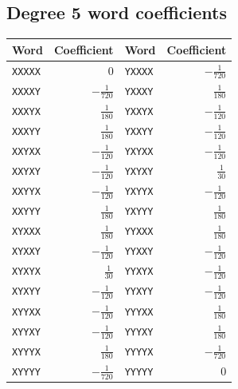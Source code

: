 \subsection*{Degree 5 word coefficients}
\begin{center}\small\begin{tabular}{lrlr}\toprule
Word & Coefficient & Word & Coefficient\\\midrule
\texttt{XXXXX} & $0$ & \texttt{YXXXX} & $-\tfrac{1}{720}$\\
\texttt{XXXXY} & $-\tfrac{1}{720}$ & \texttt{YXXXY} & $\tfrac{1}{180}$\\
\texttt{XXXYX} & $\tfrac{1}{180}$ & \texttt{YXXYX} & $-\tfrac{1}{120}$\\
\texttt{XXXYY} & $\tfrac{1}{180}$ & \texttt{YXXYY} & $-\tfrac{1}{120}$\\
\texttt{XXYXX} & $-\tfrac{1}{120}$ & \texttt{YXYXX} & $-\tfrac{1}{120}$\\
\texttt{XXYXY} & $-\tfrac{1}{120}$ & \texttt{YXYXY} & $\tfrac{1}{30}$\\
\texttt{XXYYX} & $-\tfrac{1}{120}$ & \texttt{YXYYX} & $-\tfrac{1}{120}$\\
\texttt{XXYYY} & $\tfrac{1}{180}$ & \texttt{YXYYY} & $\tfrac{1}{180}$\\
\texttt{XYXXX} & $\tfrac{1}{180}$ & \texttt{YYXXX} & $\tfrac{1}{180}$\\
\texttt{XYXXY} & $-\tfrac{1}{120}$ & \texttt{YYXXY} & $-\tfrac{1}{120}$\\
\texttt{XYXYX} & $\tfrac{1}{30}$ & \texttt{YYXYX} & $-\tfrac{1}{120}$\\
\texttt{XYXYY} & $-\tfrac{1}{120}$ & \texttt{YYXYY} & $-\tfrac{1}{120}$\\
\texttt{XYYXX} & $-\tfrac{1}{120}$ & \texttt{YYYXX} & $\tfrac{1}{180}$\\
\texttt{XYYXY} & $-\tfrac{1}{120}$ & \texttt{YYYXY} & $\tfrac{1}{180}$\\
\texttt{XYYYX} & $\tfrac{1}{180}$ & \texttt{YYYYX} & $-\tfrac{1}{720}$\\
\texttt{XYYYY} & $-\tfrac{1}{720}$ & \texttt{YYYYY} & $0$\\
\bottomrule\end{tabular}\end{center}
